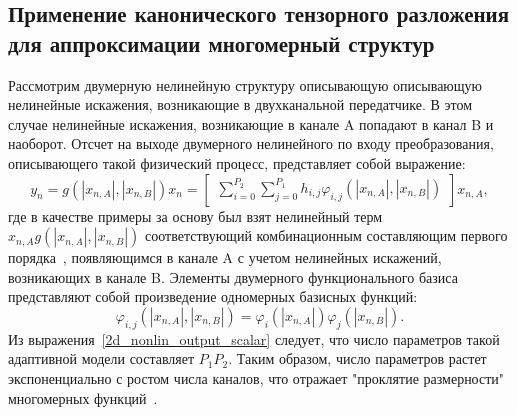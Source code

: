\subsection{Применение канонического тензорного разложения для аппроксимации многомерный структур} \label{subsec:tensor_canonical}

Рассмотрим двумерную нелинейную структуру описывающую описывающую нелинейные искажения, возникающие в двухканальной передатчике. В этом случае нелинейные искажения, возникающие в канале A попадают в канал B и наоборот. Отсчет на выходе двумерного нелинейного по входу преобразования, описывающего такой физический процесс, представляет собой выражение:
\begin{equation}
	y_n=g(|x_{n, A}|, |x_{n, B}|)x_n=\begin{bmatrix}
		\displaystyle\sum_{i=0}^{P_2}\sum_{j=0}^{P_1}h_{i,j}\varphi_{i,j}(|x_{n, A}|, |x_{n, B}|)
	\end{bmatrix}x_{n, A},
	\label{2d_nonlin_output_scalar}
\end{equation}
где в качестве примеры за основу был взят нелинейный терм $x_{n, A}g(|x_{n, A}|, |x_{n, B}|)$ соответствующий комбинационным составляющим первого порядка~\cite{dpd_models}, появляющимся в канале A с учетом нелинейных искажений, возникающих в канале B. Элементы двумерного функционального базиса представляют собой произведение одномерных базисных функций:
\begin{equation}
	\varphi_{i,j}(|x_{n, A}|, |x_{n, B}|)=\varphi_{i}(|x_{n, A}|)\varphi_{j}(|x_{n, B}|).
	\label{2d_nonlin_basis_functions}
\end{equation} 
Из выражения~\eqref{2d_nonlin_output_scalar} следует, что число параметров такой адаптивной модели составляет $P_1P_2$. Таким образом, число параметров растет экспоненциально с ростом числа каналов, что отражает "проклятие размерности" многомерных функций~\cite{bellman1961adaptive}.

